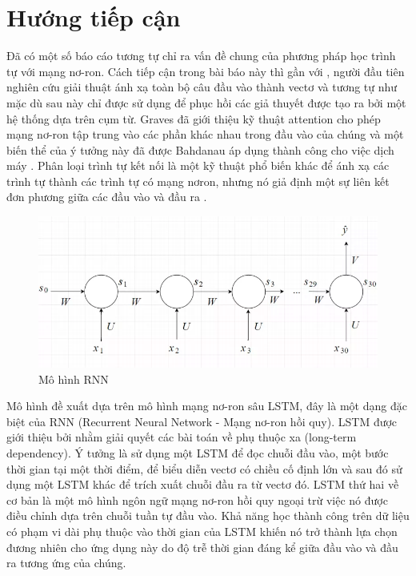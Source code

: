 \section{Hướng tiếp cận}

Đã có một số báo cáo tương tự chỉ ra vấn đề chung của phương pháp học trình tự với mạng nơ-ron. Cách tiếp cận trong bài báo này thì gần với \citep{kalchbrenner2013recurrent}, người đầu tiên nghiên cứu giải thuật ánh xạ toàn bộ câu đầu vào thành vectơ và tương tự như \citep{cho2014learning} mặc dù sau này chỉ được sử dụng để phục hồi các giả thuyết được tạo ra bởi một hệ thống dựa trên cụm từ. Graves \citep{graves2015generating} đã giới thiệu kỹ thuật attention cho phép mạng nơ-ron tập trung vào các phần khác nhau trong đầu vào của chúng và một biến thể của ý tưởng này đã được Bahdanau áp dụng thành công cho việc dịch máy \citep{bahdanau2019neural}. Phân loại trình tự kết nối là một kỹ thuật phổ biến khác để ánh xạ các trình tự thành các trình tự có mạng nơron, nhưng nó giả định một sự liên kết đơn phương giữa các đầu vào và đầu ra \citep{graves2006connectionist}.

\begin{figure}
	\centering
	\includegraphics[scale=0.3]{img/rnn.png}
	\caption{Mô hình RNN}
	\label{rnn}
\end{figure}

Mô hình đề xuất dựa trên mô hình mạng nơ-ron sâu LSTM, đây là một dạng đặc biệt của RNN (Recurrent Neural Network - Mạng nơ-ron hồi quy). LSTM được giới thiệu bởi \citep{HochreiterandSchmidhuber1997} nhằm giải quyết các bài toán về phụ thuộc xa (long-term dependency). Ý tưởng là sử dụng một LSTM để đọc chuỗi đầu vào, một bước thời gian tại một thời điểm, để biểu diễn vectơ có chiều cố định lớn và sau đó sử dụng một LSTM khác để trích xuất chuỗi đầu ra từ vectơ đó. LSTM thứ hai về cơ bản là một mô hình ngôn ngữ mạng nơ-ron hồi quy \citep{Mikolov2010} ngoại trừ việc nó được điều chỉnh dựa trên chuỗi tuần tự đầu vào. Khả năng học thành công trên dữ liệu có phạm vi dài phụ thuộc vào thời gian của LSTM khiến nó trở thành lựa chọn đương nhiên cho ứng dụng này do độ trễ thời gian đáng kể giữa đầu vào và đầu ra tương ứng của chúng.

